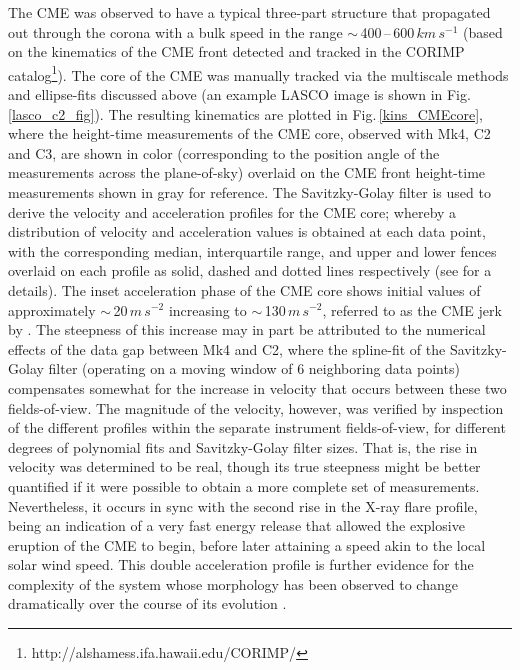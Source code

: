 \documentclass[namedreferences]{solarphysics}
\begin{document}
\begin{article}
The CME was observed to have a typical three-part structure that propagated out through the corona with a bulk speed in the range $\sim$\,400\,--\,600$\,km\,s^{-1}$ (based on the kinematics of the CME front detected and tracked in the CORIMP catalog\footnote{http://alshamess.ifa.hawaii.edu/CORIMP/}). The core of the CME was manually tracked via the multiscale methods and ellipse-fits discussed above (an example LASCO image is shown in Fig.\,\ref{lasco_c2_fig}). The resulting kinematics are plotted in Fig.\,\ref{kins_CMEcore}, where the height-time measurements of the CME core, observed with Mk4, C2 and C3, are shown in color (corresponding to the position angle of the measurements across the plane-of-sky) overlaid on the CME front height-time measurements shown in gray for reference. The Savitzky-Golay filter is used to derive the velocity and acceleration profiles for the CME core; whereby a distribution of velocity and acceleration values is obtained at each data point, with the corresponding median, interquartile range, and upper and lower fences overlaid on each profile as solid, dashed and dotted lines respectively (see  for a details). The inset acceleration phase of the CME core shows initial values of approximately $\sim$\,20$\,m\,s^{-2}$ increasing to $\sim$\,130$\,m\,s^{-2}$, referred to as the CME jerk by . The steepness of this increase may in part be attributed to the numerical effects of the data gap between Mk4 and C2, where the spline-fit of the Savitzky-Golay filter (operating on a moving window of 6 neighboring data points) compensates somewhat for the increase in velocity that occurs between these two fields-of-view. The magnitude of the velocity, however, was verified by inspection of the different profiles within the separate instrument fields-of-view, for different degrees of polynomial fits and Savitzky-Golay filter sizes. That is, the rise in velocity was determined to be real, though its true steepness might be better quantified if it were possible to obtain a more complete set of measurements. Nevertheless, it occurs in sync with the second rise in the X-ray flare profile, being an indication of a very fast energy release that allowed the explosive eruption of the CME to begin, before later attaining a speed akin to the local solar wind speed. This double acceleration profile is further evidence for the complexity of the system whose morphology has been observed to change dramatically over the course of its evolution \cite{2013ApJS..206...19M, 2012ApJ...746L...5S}.




\end{article}
\end{document}
